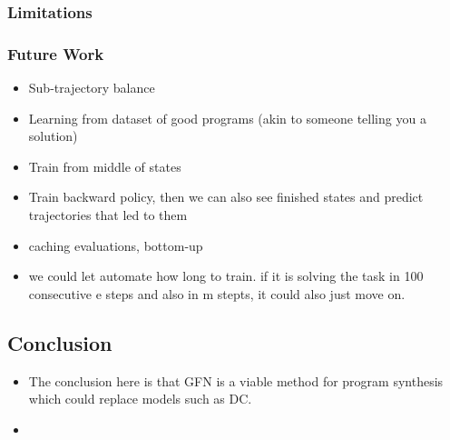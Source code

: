 \subsubsection{Limitations}

\subsubsection{Future Work}
\begin{itemize}
    \item Sub-trajectory balance
    \item Learning from dataset of good programs (akin to someone telling you a solution)
    \item Train from middle of states
    \item Train backward policy, then we can also see finished states and predict trajectories that led to them
    \item caching evaluations, bottom-up
    \item we could let automate how long to train. if it is solving the task in 100 consecutive e steps and also in m stepts, it could also just move on. 

\end{itemize}












\subsection{Conclusion}
\begin{itemize}
    \item The conclusion here is that GFN is a viable method for program synthesis which could replace models such as DC. 
    \item 
\end{itemize}

